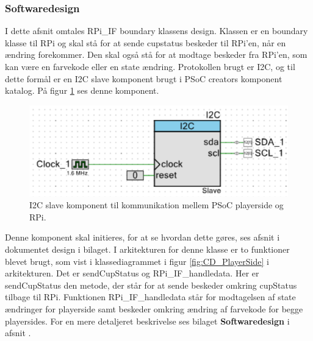 \documentclass[Rapport/Playerside/RPI_IF/RPI_IF.tex]{subfiles}
\begin{document}
\subsubsection{Softwaredesign}
I dette afsnit omtales RPi\_IF boundary klassens design. Klassen er en boundary klasse til RPi og skal stå for at sende cupstatus beskeder til RPi'en, når en ændring forekommer. Den skal også stå for at modtage beskeder fra RPi'en, som kan være en farvekode eller en state ændring. Protokollen brugt er I2C, og til dette formål er en I2C slave komponent brugt i PSoC creators komponent katalog. På figur \ref{fig:I2c_slave} ses denne komponent.
\begin{figure}[H]
    \centering 
    \includegraphics[width=\linewidth]{Softwaredesign/RPI_IF/graphics/i2c_enhed.PNG}
    \caption{I2C slave komponent til kommunikation mellem PSoC playerside og RPi.}
    \label{fig:I2c_slave}
\end{figure}
Denne komponent skal initieres, for at se hvordan dette gøres, ses afsnit  i dokumentet design i bilaget. I arkitekturen for denne klasse er to funktioner blevet brugt, som vist i klassediagrammet i figur \ref{fig:CD_PlayerSide} i arkitekturen. Det er sendCupStatus og RPi\_IF\_handledata. Her er sendCupStatus den metode, der står for at sende beskeder omkring cupStatus tilbage til RPi. Funktionen  RPi\_IF\_handledata står for modtagelsen af state ændringer for playerside samt beskeder omkring ændring af farvekode for begge playersides. For en mere detaljeret beskrivelse ses bilaget \textbf{Softwaredesign} i afsnit .
\end{document}
